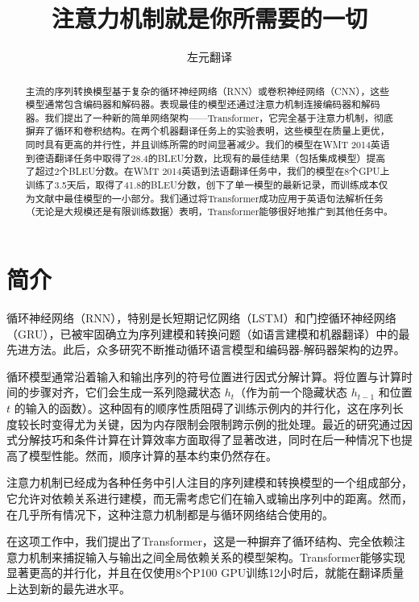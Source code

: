 \documentclass[lang=cn,a4paper,newtx]{elegantpaper}
\title{注意力机制就是你所需要的一切}
\author{左元翻译}
\begin{document}
\maketitle

\begin{abstract}
  主流的序列转换模型基于复杂的循环神经网络（RNN）或卷积神经网络（CNN），这些模型通常包含编码器和解码器。表现最佳的模型还通过注意力机制连接编码器和解码器。我们提出了一种新的简单网络架构——Transformer，它完全基于注意力机制，彻底摒弃了循环和卷积结构。在两个机器翻译任务上的实验表明，这些模型在质量上更优，同时具有更高的并行性，并且训练所需的时间显著减少。我们的模型在WMT 2014英语到德语翻译任务中取得了28.4的BLEU分数，比现有的最佳结果（包括集成模型）提高了超过2个BLEU分数。在WMT 2014英语到法语翻译任务中，我们的模型在8个GPU上训练了3.5天后，取得了41.8的BLEU分数，创下了单一模型的最新记录，而训练成本仅为文献中最佳模型的一小部分。我们通过将Transformer成功应用于英语句法解析任务（无论是大规模还是有限训练数据）表明，Transformer能够很好地推广到其他任务中。
\end{abstract}

\newpage

\tableofcontents

\newpage

\section{简介}

循环神经网络（RNN），特别是长短期记忆网络（LSTM）和门控循环神经网络（GRU），已被牢固确立为序列建模和转换问题（如语言建模和机器翻译）中的最先进方法。此后，众多研究不断推动循环语言模型和编码器-解码器架构的边界。

循环模型通常沿着输入和输出序列的符号位置进行因式分解计算。将位置与计算时间的步骤对齐，它们会生成一系列隐藏状态 $h_t$（作为前一个隐藏状态 $h_{t-1}$ 和位置 $t$ 的输入的函数）。这种固有的顺序性质阻碍了训练示例内的并行化，这在序列长度较长时变得尤为关键，因为内存限制会限制跨示例的批处理。最近的研究通过因式分解技巧和条件计算在计算效率方面取得了显著改进，同时在后一种情况下也提高了模型性能。然而，顺序计算的基本约束仍然存在。

注意力机制已经成为各种任务中引人注目的序列建模和转换模型的一个组成部分，它允许对依赖关系进行建模，而无需考虑它们在输入或输出序列中的距离。然而，在几乎所有情况下，这种注意力机制都是与循环网络结合使用的。

在这项工作中，我们提出了Transformer，这是一种摒弃了循环结构、完全依赖注意力机制来捕捉输入与输出之间全局依赖关系的模型架构。Transformer能够实现显著更高的并行化，并且在仅使用8个P100 GPU训练12小时后，就能在翻译质量上达到新的最先进水平。
\end{document}
